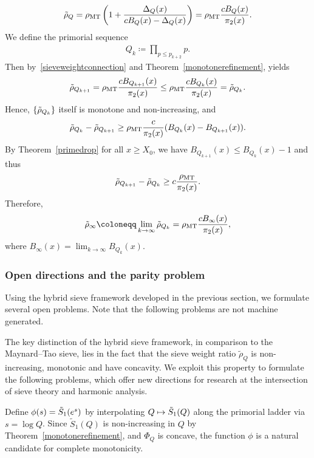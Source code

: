 \documentclass[11pt,reqno]{amsart}
\theoremstyle{plain}\newtheorem{theorem}{Theorem}[section]
\numberwithin{equation}{section}
\begin{document}
\begin{align}\label{sieveweightconnection}
\Tilde{\rho}_Q 
=\rho_{\mathrm{MT}}\left(1+\frac{\Delta_Q(x)}{cB_Q(x)-\Delta_Q(x)}\right)
=\rho_{\mathrm{MT}}\frac{cB_Q(x)}{\pi_2(x)}.
\end{align}
\noindent
We define the primorial sequence 
\begin{align*}
Q_k
\coloneqq \prod_{p\leq p_{k+2}}p.
\end{align*}
Then by~\eqref{sieveweightconnection} and Theorem~\ref{monotonerefinement}, yields
\begin{align*}
\Tilde{\rho}_{Q_{k+1}}
=\rho_{\mathrm{MT}}\frac{cB_{Q_{k+1}}(x)}{\pi_2(x)}
\leq \rho_{\mathrm{MT}}\frac{cB_{Q_{k}}(x)}{\pi_2(x)}
=\Tilde{\rho}_{Q_{k}}.
\end{align*}
Hence, $\{\Tilde{\rho}_{Q_{k}}\}$ itself is monotone and non-increasing, and
\begin{align*}
\Tilde{\rho}_{Q_{k}}-\Tilde{\rho}_{Q_{k+1}}
\geq \rho_{\mathrm{MT}}\frac{c}{\pi_2(x)}(B_{Q_{k}}(x)-B_{Q_{k+1}}(x)).
\end{align*}
By Theorem~\ref{primedrop} for all $x\geq X_0$, we have $B_{Q_{k+1}}(x)\leq B_{Q_{k}}(x)-1$ and thus
\begin{align*}
\Tilde{\rho}_{Q_{k+1}}-\Tilde{\rho}_{Q_{k}}  
\geq c\frac{\rho_{\mathrm{MT}}}{\pi_2(x)}.
\end{align*}
Therefore,
\begin{align*}
\Tilde{\rho}_{\infty}
\coloneqq\lim_{k\to\infty} \Tilde{\rho}_{Q_{k}} 
=\rho_{\mathrm{MT}} \frac{cB_{\infty}(x)}{\pi_2(x)},
\end{align*}
where $B_{\infty}(x)=\lim_{k\to\infty}B_{Q_k}(x)$.

\subsubsection{Open directions and the parity problem}\label{openproblems}
Using the hybrid sieve framework developed in the previous section, we formulate several open problems. Note that the following problems are not machine generated. 

\medskip
The key distinction of the hybrid sieve framework, in comparison to the Maynard–Tao sieve, lies in the fact that the sieve weight ratio $\tilde{\rho}_Q$ is non-increasing, monotonic and have concavity. We exploit this property to formulate the following problems, which offer new directions for research at the intersection of sieve theory and harmonic analysis.

\medskip
\noindent
Define $\phi(s)=\Tilde{S}_1(e^s)$ by interpolating $Q \mapsto \Tilde{S}_1(Q)$ along the primorial ladder via $s = \log Q$. Since $\widetilde{S}_1(Q)$ is non-increasing in $Q$ by Theorem~\ref{monotonerefinement}, and $\Phi_Q$ is concave, the function $\phi$ is a natural candidate for complete monotonicity.
\end{document}
